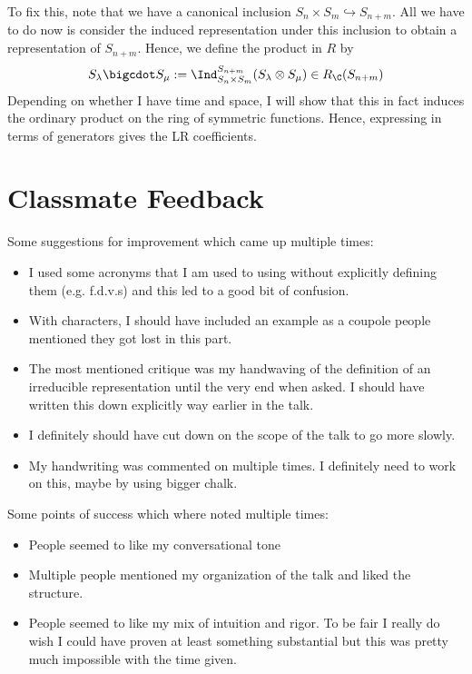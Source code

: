 \documentclass[12pt]{article}
\begin{document}
To fix this, note that we have a canonical inclusion $ S_{n}\times S_{m}\hookrightarrow S_{n+m} $. All we have to do now is consider the induced representation under this inclusion to obtain a representation of $ S_{n+m} $. Hence, we define the product in $ R $ by 
\[
  S_{\lambda}\bigcdot S_{\mu} := \Ind_{S_{n}\times S_{m}}^{S_{n+m}} (S_{\lambda}\otimes S_{\mu}) \in R_{\C}(S_{n+m})
\]
Depending on whether I have time and space, I will show that this in fact induces the ordinary product on the ring of symmetric functions. Hence, expressing in terms of generators gives the LR coefficients.

\newpage


\section{Classmate Feedback}

Some suggestions for improvement which came up multiple times:
\begin{itemize}
  \item I used some acronyms that I am used to using without explicitly defining them (e.g. f.d.v.s) and this led to a good bit of confusion.
  \item With characters, I should have included an example as a coupole people mentioned they got lost in this part.
  \item The most mentioned critique was my handwaving of the definition of an irreducible representation until the very end when asked. I should have written this down explicitly way earlier in the talk.
  \item I definitely should have cut down on the scope of the talk to go more slowly.
  \item My handwriting was commented on multiple times. I definitely need to work on this, maybe by using bigger chalk.
\end{itemize}
Some points of success which where noted multiple times:

\begin{itemize}
  \item People seemed to like my conversational tone
  \item Multiple people mentioned my organization of the talk and liked the structure.
  \item People seemed to like my mix of intuition and rigor. To be fair I really do wish I could have proven at least something substantial but this was pretty much impossible with the time given.
\end{itemize}
\end{document}
